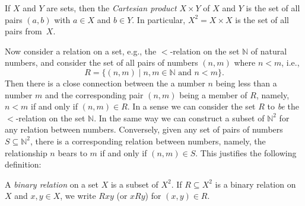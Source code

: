 \documentclass[misc]{subfiles}
\begin{document}
\begin{defn}
If $X$ and $Y$ are sets, then the \emph{Cartesian product} $X \times Y$
of $X$ and $Y$ is the set of all pairs $(a,b)$ with $a\in X$ and
$b\in Y$. In particular, $X^{2}=X \times X$ is the set of all pairs
from~$X$.
\end{defn}

Now consider a relation on a set, e.g., the $<$-relation on the set
$\mathbb{N}$ of natural numbers, and consider the set of all pairs
of numbers $(n,m)$ where $n<m$, i.e.,
\[
R=\{(n,m)\mid n,m\in\mathbb{N}\text{ and }n<m\}.
\]
Then there is a close connection between the a number $n$ being less
than a number $m$ and the corresponding pair $(n,m)$ being a member
of $R$, namely, $n<m$ if and only if $(n,m) \in R$. In a sense we
can consider the set $R$ to \emph{be} the $<$-relation on the set
$\mathbb{N}$. In the same way we can construct a subset of $\mathbb{N}^{2}$ for
any relation between numbers. Conversely, given any set of pairs of
numbers $S\subseteq\mathbb{N}^{2}$, there is a corresponding relation
between numbers, namely, the relationship $n$ bears to $m$ if and
only if $(n,m) \in S$. This justifies the following definition:

\begin{defn}
A \emph{binary relation} on a set $X$ is a subset of $X^{2}$. If
$R\subseteq X^{2}$ is a binary relation on~$X$ and $x,y\in X$,
we write $Rxy$ (or $xRy$) for $(x,y)\in R$.
\end{defn}
\end{document}
